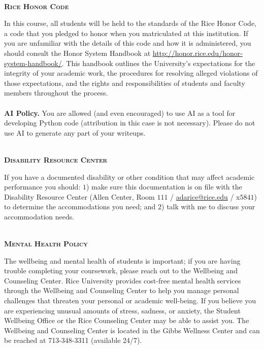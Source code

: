 \documentclass[11pt]{article}
\begin{document}
~\\
\textbf{\textsc{Rice Honor Code}}
\begin{adjustwidth}{1cm}{0cm}
  In this course, all students will be held to the standards of the Rice Honor Code, a code that you pledged to honor when you matriculated at this institution. If you are unfamiliar with the details of this code and how it is administered, you should consult the Honor System Handbook at \url{http://honor.rice.edu/honor-system-handbook/}. This handbook outlines the University's expectations for the integrity of your academic work, the procedures for resolving alleged violations of those expectations, and the rights and responsibilities of students and faculty members throughout the process.\\
  ~\\
  \textbf{AI Policy.} You are allowed (and even encouraged) to use AI as a tool for developing Python code (attribution in this case is not necessary). Please do not use AI to generate any part of your writeups.
\end{adjustwidth}

~\\
\textbf{\textsc{Disability Resource Center}}
\begin{adjustwidth}{1cm}{0cm}
  If you have a documented disability or other condition that may affect academic performance you should: $1$) make sure this documentation is on file with the Disability Resource Center (Allen Center, Room $111$ / \href{mailto:adarice@rice.edu}{adarice@rice.edu} / x$5841$) to determine the accommodations you need; and $2$) talk with me to discuss your accommodation needs.
\end{adjustwidth}

~\\
\textbf{\textsc{Mental Health Policy}}
\begin{adjustwidth}{1cm}{0cm}
	The wellbeing and mental health of students is important; if you are having trouble completing your coursework, please reach out to the Wellbeing and Counseling Center. Rice University provides cost-free mental health services through the Wellbeing and Counseling Center to help you manage personal challenges that threaten your personal or academic well-being. If you believe you are experiencing unusual amounts of stress, sadness, or anxiety, the Student Wellbeing Office or the Rice Counseling Center may be able to assist you. The Wellbeing and Counseling Center is located in the Gibbs Wellness Center and can be reached at 713-348-3311 (available 24/7).
\end{adjustwidth}
\end{document}
